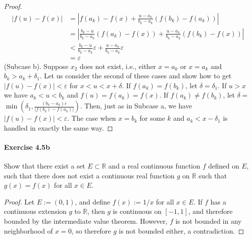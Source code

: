 \documentclass{article}
\theoremstyle{definition}
\begin{document}
\begin{proof}
$$
\begin{aligned}
|f(u)-f(x)| & =\left|f\left(a_k\right)-f(x)+\frac{u-a_k}{b_k-a_k}\left(f\left(b_k\right)-f\left(a_k\right)\right)\right| \\
& =\left|\frac{b_k-u}{b_k-a_k}\left(f\left(a_k\right)-f(x)\right)+\frac{u-a_k}{b_k-a_k}\left(f\left(b_k\right)-f(x)\right)\right| \\
& <\frac{b_k-u}{b_k-a_k} \varepsilon+\frac{u-a_k}{b_k-a_k} \varepsilon \\
& =\varepsilon
\end{aligned}
$$
(Subcase b). Suppose $x_2$ does not exist, i.e., either $x=a_k$ or $x=a_k$ and $b_k>a_k+\delta_1$. Let us consider the second of these cases and show how to get $|f(u)-f(x)|<\varepsilon$ for $x<u<x+\delta$. If $f\left(a_k\right)=f\left(b_k\right)$, let $\delta=\delta_1$. If $u>x$ we have $a_k<u<b_k$ and $f(u)=f\left(a_k\right)=f(x)$. If $f\left(a_k\right) \neq f\left(b_k\right)$, let $\delta=$ $\min \left(\delta_1, \frac{\left(b_k-a_k\right) \varepsilon}{\left|f\left(b_k\right)-f\left(a_k\right)\right|}\right)$. Then, just as in Subcase a, we have $|f(u)-f(x)|<\varepsilon$.
The case when $x=b_k$ for some $k$ and $a_k<x-\delta_1$ is handled in exactly the same way.
\end{proof}




\paragraph{Exercise 4.5b} Show that there exist a set $E \subset \mathbb{R}$ and a real continuous function $f$ defined on $E$, such that there does not exist a continuous real function $g$ on $\mathbb{R}$ such that $g(x)=f(x)$ for all $x \in E$.
\begin{proof}
    Let $E:=(0,1)$, and define $f(x):=1 / x$ for all $x \in E$. If $f$ has a continuous extension $g$ to $\mathbb{R}$, then $g$ is continuous on $[-1,1]$, and therefore bounded by the intermediate value theorem. However, $f$ is not bounded in any neighborhood of $x=0$, so therefore $g$ is not bounded either, a contradiction.
\end{proof}
\end{document}
